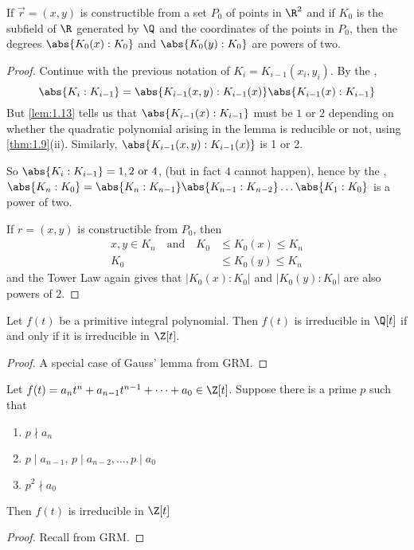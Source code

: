 \documentclass{article}
\begin{document}
\begin{nthm}\label{thm:1.14}
    If $\vec{r} = (x, y)$ is constructible from a set $P_0$ of points in $\R^2$ and if $K_0$ is the subfield of $\R$ generated by $\Q$ and the coordinates of the points in $P_0$, then the degrees $\abs{K_0(x) : K_0}$ and $\abs{K_0(y):K_0}$ are powers of two.
\end{nthm}
\begin{proof}
    Continue with the previous notation of $K_i = K_{i-1}(x_i, y_i)$. By the ,
    \begin{equation*}
        \abs{K_i : K_{i-1}} = \abs{K_{i-1} (x, y): K_{i-1}(x)} \abs{K_{i-1}(x) : K_{i-1}}
    \end{equation*}
    But \cref{lem:1.13} tells us that $\abs{K_{i-1}(x):K_{i-1}}$ must be $1$ or $2$ depending on whether the quadratic polynomial arising in the lemma is reducible or not, using \cref{thm:1.9}(ii). Similarly, $\abs{K_{i-1}(x, y):K_{i-1}(x)}$ is 1 or 2.

    So $\abs{K_i: K_{i-1}} = 1, 2 \ \text{or} \ 4$, (but in fact $4$ cannot happen), hence by the , $\abs{K_n:K_0} = \abs{K_n:K_{n-1}} \abs{K_{n-1} : K_{n-2}} \dots \abs{K_1:K_0}$ is a power of two.

    If $r = (x, y)$ is constructible from $P_0$, then
    \begin{align*}
        x, y \in K_n \quad \text{and} \quad K_0 &\leq K_0(x) \leq K_n \\
        K_0 &\leq K_0(y) \leq K_n
    \end{align*}
    and the Tower Law again gives that $|K_0(x):K_0|$ and $|K_0(y):K_0|$ are also powers of $2$.
\end{proof}


\begin{nthm}\label{thm:1.15}
    Let $f(t)$ be a primitive integral polynomial.  Then $f(t)$ is irreducible in $\Q[t]$ if and only if it is irreducible in $\Z[t]$.
\end{nthm}
\begin{proof}
    A special case of Gauss' lemma from GRM.
\end{proof}
\begin{nthm}\label{thm:1.16}
    Let $f(t) = a_n t^n + a_{n-1} t^{n-1} + \dots + a_0 \in \Z[t]$.
    Suppose there is a prime $p$ such that
    \begin{enumerate}[label=(\roman*)]
        \item $p \nmid a_n$
        \item $p \mid a_{n-1}, \, p \mid a_{n-2}, \dotsc, p \mid a_0$
        \item $p^2 \nmid a_0$
    \end{enumerate}
    Then $f(t)$ is irreducible in $\Z[t]$
\end{nthm}
\begin{proof}
    Recall from GRM.
\end{proof}
\end{document}
